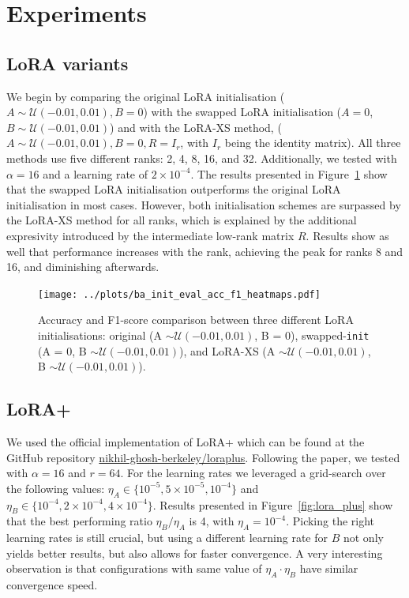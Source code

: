 \documentclass[a4paper,10pt,twocolumn,english]{article}
\begin{document}
\section{Experiments}

\subsection{LoRA variants}

We begin by comparing the original LoRA initialisation ($A \sim \mathcal{U}(-0.01, 0.01), B = 0$) with the swapped LoRA initialisation ($A = 0$, $B \sim \mathcal{U}(-0.01, 0.01)$) and with the LoRA-XS method, ($A \sim \mathcal{U}(-0.01, 0.01), B = 0, R = I_r$, with $I_r$ being the identity matrix). All three methods use five different ranks: 2, 4, 8, 16, and 32. Additionally, we tested with $\alpha = 16$ and a learning rate of $2 \times 10 ^ {-4}$. The results presented in Figure~\ref{fig:ba_init} show that the swapped LoRA initialisation outperforms the original LoRA initialisation in most cases. However, both initialisation schemes are surpassed by the LoRA-XS method for all ranks, which is explained by the additional expresivity introduced by the intermediate low-rank matrix $R$. Results show as well that performance increases with the rank, achieving the peak for ranks 8 and 16, and diminishing afterwards.

\begin{figure}[ht]
    \centering
    \texttt{[image: ../plots/ba\_init\_eval\_acc\_f1\_heatmaps.pdf]}
    \caption{Accuracy and F1-score comparison between three different LoRA initialisations: original (A $\sim \mathcal{U}(-0.01, 0.01)$, B = 0), swapped-\texttt{init} (A = 0, B $\sim \mathcal{U}(-0.01, 0.01)$), and LoRA-XS (A $\sim \mathcal{U}(-0.01, 0.01)$, B $\sim \mathcal{U}(-0.01, 0.01)$).}
    \label{fig:ba_init}
\end{figure}



\subsection{LoRA+}

We used the official implementation of LoRA+ which can be found at the GitHub repository \href{https://github.com/nikhil-ghosh-berkeley/loraplus}{nikhil-ghosh-berkeley/loraplus}. Following the paper, we tested with $\alpha = 16$ and $r = 64$. For the learning rates we leveraged a grid-search over the following values: $\eta_A \in \{10^{-5}, 5 \times 10^{-5}, 10^{-4}\}$ and $\eta_B \in \{10^{-4}, 2 \times 10^{-4}, 4 \times 10^{-4}\}$. Results presented in Figure~\ref{fig:lora_plus} show that the best performing ratio $\eta_B / \eta_A$ is 4, with $\eta_A = 10^{-4}$. Picking the right learning rates is still crucial, but using a different learning rate for $B$ not only yields better results, but also allows for faster convergence. A very interesting observation is that configurations with same value of $\eta_A \cdot \eta_B$ have similar convergence speed.
\end{document}
